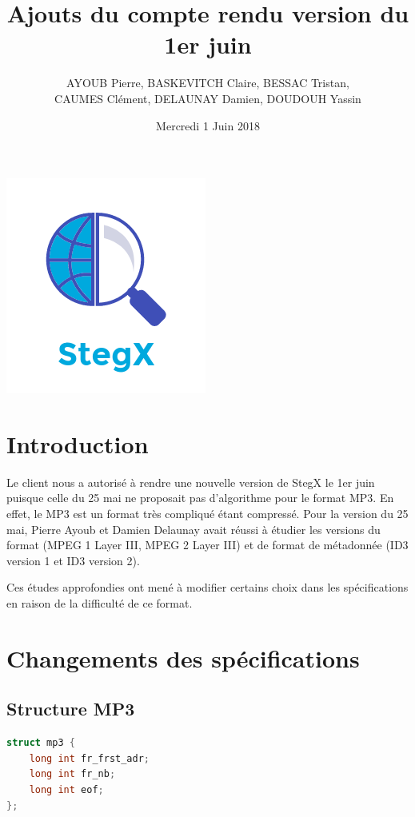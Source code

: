 \documentclass[11pt]{article}
\title{\huge{\textbf Ajouts du compte rendu version du 1{er} juin}}
\author{AYOUB Pierre, BASKEVITCH Claire, BESSAC Tristan, \\
CAUMES Clément, DELAUNAY Damien, DOUDOUH Yassin}
\date{Mercredi 1 Juin 2018}
\begin{document}
\maketitle
\vspace{20em}
\begin{center}\includegraphics{pictures/Application.png}\end{center}
\newpage

\section{Introduction}

Le client nous a autorisé à rendre une nouvelle version de StegX le 1er
juin puisque celle du 25 mai ne proposait pas d'algorithme pour le format 
MP3. En effet, le MP3 est un format très compliqué étant compressé. 
Pour la version du 25 mai, Pierre Ayoub et Damien Delaunay avait réussi à 
étudier les versions du format (MPEG 1 Layer III, MPEG 2 Layer III) et de 
format de métadonnée (ID3 version 1 et ID3 version 2). 

Ces études approfondies ont mené à modifier certains choix dans les spécifications 
en raison de la difficulté de ce format. 

\section{Changements des spécifications}

\subsection{Structure MP3}

\begin{lstlisting}[language=c]
struct mp3 {
    long int fr_frst_adr; 
    long int fr_nb;       
    long int eof;      
};
\end{lstlisting}
\end{document}
